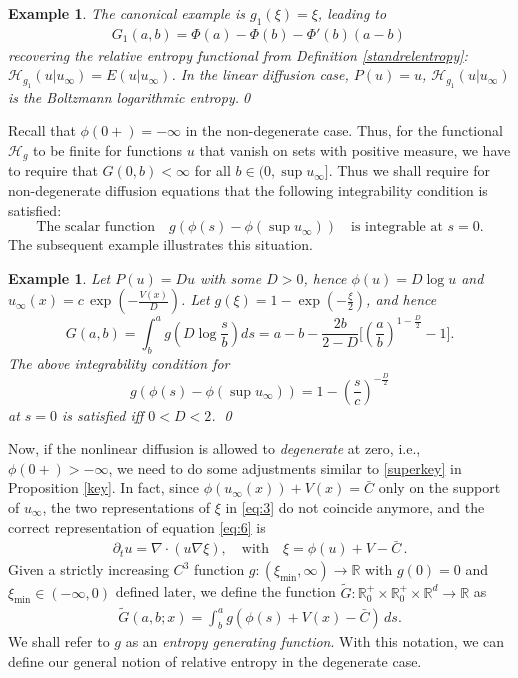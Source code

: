 \documentclass[reqno]{amsart}
\newtheorem{example}[lemma]{Example}
\newcommand{\setR}{\mathbb{R}}
\newcommand{\R}{\mathbb{R}}
\renewcommand{\H}{{\mathcal{H}}}
\newcommand{\uinf}{u_\infty}
\begin{document}
\begin{example}\label{sam1}
The canonical example is $g_1(\xi)=\xi$, leading to
\begin{align*}
  G_1(a,b) = \Phi(a)-\Phi(b)-\Phi'(b)(a-b)\,
\end{align*}
recovering the  
relative entropy functional from Definition \ref{standrelentropy}: 
$\mathcal{H}_{g_1}(u|u_\infty)=E(u|u_\infty)$.
In the linear diffusion case, $P(u)=u$, $\mathcal{H}_{g_1}(u|u_\infty)$ is the Boltzmann logarithmic entropy.\qed
\end{example}

Recall that $\phi(0+)=-\infty$ in the non-degenerate case. Thus, for the functional $\H_g$ to be finite for functions $u$ that vanish on sets with positive measure, we have to require that $G(0,b)<\infty$ for all $b\in(0,\sup u_\infty]$. Thus we shall require for non-degenerate diffusion equations that the following integrability condition is satisfied:
\begin{equation}\label{int-cond}
    \mbox{The scalar function}\quad g(\phi(s)-\phi(\sup u_\infty))\quad \mbox{is integrable at } s=0.
\end{equation}
The subsequent example illustrates this situation.

\begin{example}%
Let $P(u)=Du$ with some $D>0$, hence $\phi(u)=D\log u$ and $u_\infty(x)=c\,\exp(-\frac{V(x)}{D})$. Let $g(\xi)=1-\exp(-\frac\xi2)$, and hence
$$
  G(a,b)=\int_b^a g\left(D\log\frac{s}{b}\right)ds 
   = a-b-\frac{2b}{2-D}\Big[\left(\frac{a}{b}\right)^{1-\frac{D}{2}}-1\Big]. 
$$
The above integrability condition for
$$
  g(\phi(s)-\phi(\sup u_\infty)) = 1-\left(\frac{s}{c}\right)^{-\frac{D}{2}}
$$
at $s=0$ is satisfied iff $0<D<2$.
\qed
\end{example}

\medskip
Now, if the nonlinear diffusion is allowed to \emph{degenerate} at zero, i.e., $\phi(0+)>-\infty$, we need to do some adjustments similar to \eqref{superkey} in Proposition \ref{key}. In fact, since $\phi(\uinf(x))+ V(x)=\bar C$ only on the support of $\uinf$, the two representations of $\xi$ in \eqref{eq:3} do not coincide anymore, and the correct representation of equation \eqref{eq:6} is
\begin{align}
  \label{eq:3b}
  \partial_t u = \nabla\cdot(u\nabla \xi) , 
  \quad \text{with} \quad \xi=\phi(u)+V-\bar C\,.
\end{align}
Given a strictly increasing $C^3$ function $g: (\xi_{\min},\infty)\to\setR$ with $g(0)=0$ and $\xi_{\min}\in (-\infty,0)$ defined later, we define the function $\tilde G:\setR^+_0\times\setR^+_0 \times\R^d\to\setR$ as 
\begin{align}\label{eq:7b}
   \tilde G(a,b;x) = \int_b^a g(\phi(s)+V(x)-\bar C) \, ds.
\end{align}  
We shall refer to $g$ as an \emph{entropy generating function}. 
With this notation, we can define our general notion of relative entropy in the degenerate case.
\end{document}
